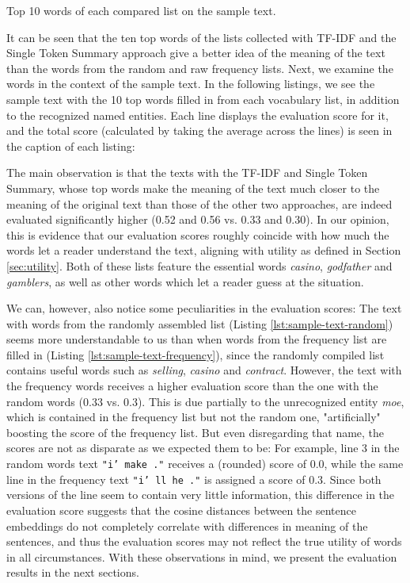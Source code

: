 \begin{table}[H]
	\centering
	
	\caption{Top 10 words of each compared list on the sample text.}
	\label{tbl:first-k-words-sample}
\end{table}

It can be seen that the ten top words of the lists collected with TF-IDF and the Single Token Summary approach give a better idea of the meaning of the text than the words from the random and raw frequency lists.
Next, we examine the words in the context of the sample text.
In the following listings, we see the sample text with the 10 top words filled in from each vocabulary list, in addition to the recognized named entities.
Each line displays the evaluation score for it, and the total score (calculated by taking the average across the lines) is seen in the caption of each listing:



The main observation is that the texts with the TF-IDF and Single Token Summary, whose top words make the meaning of the text much closer to the meaning of the original text than those of the other two approaches, are indeed evaluated significantly higher (0.52 and 0.56 vs. 0.33 and 0.30).
In our opinion, this is evidence that our evaluation scores roughly coincide with how much the words let a reader understand the text, aligning with utility as defined in Section \ref{sec:utility}.
Both of these lists feature the essential words \textit{casino}, \textit{godfather} and \textit{gamblers}, as well as other words which let a reader guess at the situation.

We can, however, also notice some peculiarities in the evaluation scores:
The text with words from the randomly assembled list (Listing \ref{lst:sample-text-random}) seems more understandable to us than when words from the  frequency list are filled in (Listing \ref{lst:sample-text-frequency}), since the randomly compiled list contains useful words such as \textit{selling}, \textit{casino} and \textit{contract}.
However, the text with the frequency words receives a higher evaluation score than the one with the random words (0.33 vs. 0.3).
This is due partially to the unrecognized entity \textit{moe}, which is contained in the frequency list but not the random one, "artificially" boosting the score of the frequency list.
But even disregarding that name, the scores are not as disparate as we expected them to be:
For example, line 3 in the random words text \texttt{"i' make       ."} receives a (rounded) score of 0.0, while the same line in the frequency text \texttt{"i' ll      he      ."} is assigned a score of 0.3.
Since both versions of the line seem to contain very little information, this difference in the evaluation score suggests that the cosine distances between the sentence embeddings do not completely correlate with differences in meaning of the sentences, and thus the evaluation scores may not reflect the true utility of words in all circumstances.
With these observations in mind, we present the evaluation results in the next sections.

